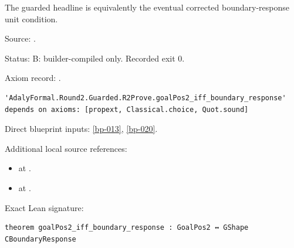 \begin{theorem}[bp-021]
\label{bp-021}
\leanok
The guarded headline is equivalently the eventual corrected boundary-response unit condition.

\par Source: \texttt{}.
\par Status: B: builder-compiled only. Recorded exit 0.
\par Axiom record: \texttt{}.
\begin{verbatim}
'AdalyFormal.Round2.Guarded.R2Prove.goalPos2_iff_boundary_response' depends on axioms: [propext, Classical.choice, Quot.sound]
\end{verbatim}
\par Direct blueprint inputs: \ref{bp-013}, \ref{bp-020}.
\par Additional local source references:
\begin{itemize}
\item \texttt{} at \texttt{}.
\item \texttt{} at \texttt{}.
\end{itemize}
\par Exact Lean signature:
\begin{verbatim}
theorem goalPos2_iff_boundary_response : GoalPos2 ↔ GShape CBoundaryResponse
\end{verbatim}
\end{theorem}

